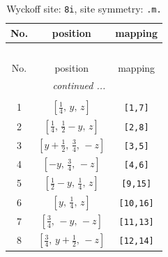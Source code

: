 \documentclass[fleqn,8pt]{jsarticle}
\begin{document}
\begin{longtable}{ccc}
\caption{Wyckoff site: {\tt 8i}, site symmetry: {\tt .m.}}
 \\
 \hline \hline
No. & position & mapping \\ \hline \endfirsthead

\multicolumn{2}{l}{\tablename\ \thetable{}} \\
 \hline \hline
No. & position & mapping \\ \hline \endhead

 \hline \hline
\multicolumn{2}{r}{\footnotesize\it continued ...} \\ \endfoot

 \hline \hline
\multicolumn{2}{r}{} \\ \endlastfoot

1 & $\left[ \frac{1}{4},\, y,\, z \right]$ & {\tt [1,7]} \\ \hline
2 & $\left[ \frac{1}{4},\, \frac{1}{2} - y,\, z \right]$ & {\tt [2,8]} \\ \hline
3 & $\left[ y + \frac{1}{2},\, \frac{3}{4},\, - z \right]$ & {\tt [3,5]} \\ \hline
4 & $\left[ - y,\, \frac{3}{4},\, - z \right]$ & {\tt [4,6]} \\ \hline
5 & $\left[ \frac{1}{2} - y,\, \frac{1}{4},\, z \right]$ & {\tt [9,15]} \\ \hline
6 & $\left[ y,\, \frac{1}{4},\, z \right]$ & {\tt [10,16]} \\ \hline
7 & $\left[ \frac{3}{4},\, - y,\, - z \right]$ & {\tt [11,13]} \\ \hline
8 & $\left[ \frac{3}{4},\, y + \frac{1}{2},\, - z \right]$ & {\tt [12,14]} \\
\end{longtable}
\renewcommand{\arraystretch}{1.2}
\end{document}
